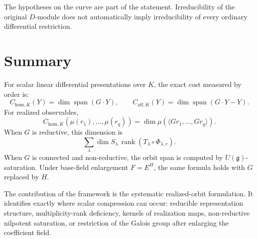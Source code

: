 \documentclass[11pt]{article}
\DeclareMathOperator{\Span}{span}
\DeclareMathOperator{\rank}{rank}
\begin{document}
The hypotheses on the curve are part of the statement. Irreducibility of the original \(D\)-module does not automatically imply irreducibility of every ordinary differential restriction.

\section{Summary}

For scalar linear differential presentations over \(K\), the exact cost measured by order is:
\[
C_{\mathrm{hom},K}(Y)=\dim\Span(G\cdot Y),
\qquad
C_{\mathrm{aff},K}(Y)=\dim\Span(G\cdot Y-Y).
\]
For realized observables,
\[
C_{\mathrm{hom},K}(\mu(r_1),\ldots,\mu(r_q))
=
\dim\mu(\langle G r_1,\ldots,G r_q\rangle).
\]
When \(G\) is reductive, this dimension is
\[
\sum_\lambda
\dim S_\lambda\,
\rank(T_\lambda\circ\Phi_{\lambda,r}).
\]
When \(G\) is connected and non-reductive, the orbit span is computed by \(U(\mathfrak g)\)-saturation. Under base-field enlargement \(F=E^H\), the same formula holds with \(G\) replaced by \(H\).

The contribution of the framework is the systematic realized-orbit formulation. It identifies exactly where scalar compression can occur: reducible representation structure, multiplicity-rank deficiency, kernels of realization maps, non-reductive nilpotent saturation, or restriction of the Galois group after enlarging the coefficient field.
\end{document}

